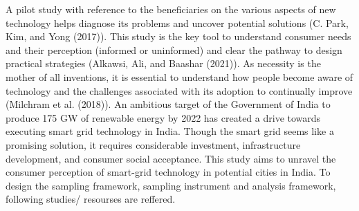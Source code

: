 \documentclass[
  letterpaper,
  DIV=11,
  numbers=noendperiod]{scrartcl}
\begin{document}
A pilot study with reference to the beneficiaries on the various aspects
of new technology helps diagnose its problems and uncover potential
solutions (C. Park, Kim, and Yong (2017)). This study is the key tool to
understand consumer needs and their perception (informed or uninformed)
and clear the pathway to design practical strategies (Alkawsi, Ali, and
Baashar (2021)). As necessity is the mother of all inventions, it is
essential to understand how people become aware of technology and the
challenges associated with its adoption to continually improve (Milchram
et al. (2018)). An ambitious target of the Government of India to
produce 175 GW of renewable energy by 2022 has created a drive towards
executing smart grid technology in India. Though the smart grid seems
like a promising solution, it requires considerable investment,
infrastructure development, and consumer social acceptance. This study
aims to unravel the consumer perception of smart-grid technology in
potential cities in India. To design the sampling framework, sampling
instrument and analysis framework, following studies/ resourses are
reffered.
\end{document}
